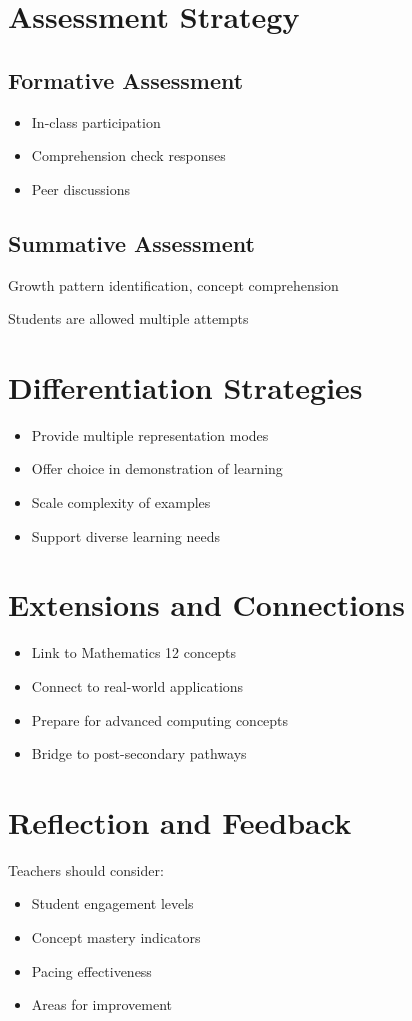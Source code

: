 \documentclass[12pt]{article}
\begin{document}
\section{Assessment Strategy}

\subsection*{Formative Assessment}
\begin{itemize}
    \item In-class participation
    \item Comprehension check responses
    \item Peer discussions
\end{itemize}

\subsection*{Summative Assessment}
\begin{tcolorbox}[colback=gray!5,colframe=bcblue,title=Quiz Structure (20 points)]
\begin{description}
    \item[Multiple Choice Practice Questions] Growth pattern identification, concept comprehension
    \item Students are allowed multiple attempts 
\end{description}
\end{tcolorbox}

\section{Differentiation Strategies}

\begin{itemize}
    \item Provide multiple representation modes
    \item Offer choice in demonstration of learning
    \item Scale complexity of examples
    \item Support diverse learning needs
\end{itemize}

\section{Extensions and Connections}

\begin{itemize}
    \item Link to Mathematics 12 concepts
    \item Connect to real-world applications
    \item Prepare for advanced computing concepts
    \item Bridge to post-secondary pathways
\end{itemize}

\section{Reflection and Feedback}

Teachers should consider:
\begin{itemize}
    \item Student engagement levels
    \item Concept mastery indicators
    \item Pacing effectiveness
    \item Areas for improvement
\end{itemize}
\end{document}
